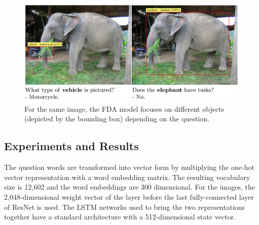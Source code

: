 \documentclass{article}
\begin{document}
    \begin{figure}[ht]
    	\centering
            \includegraphics[width=0.75\linewidth]{fdaExample.PNG}
    	\caption{For the same image, the FDA model focuses  on different objects (depicted by the bounding box) depending on the question.}
    	\label{fdaExample}
    \end{figure}

\subsection{Experiments and Results}
The question words are transformed into vector form by multiplying the one-hot vector representation with a word embedding matrix. The resulting vocabulary size is 12,602 and the word embeddings are 300 dimensional. For the images, the 2,048-dimensional weight vector of the layer before the last fully-connected layer of ResNet is used. The LSTM networks used to bring the two representations together have a standard architecture with a 512-dimensional state vector.
\end{document}
